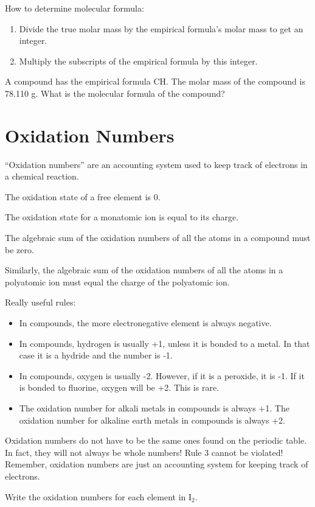 \documentclass[../hchem.tex]{subfiles}
\begin{document}
How to determine molecular formula:
\begin{enumerate}
    \item Divide the true molar mass by the empirical formula's molar mass to get an integer.
    \item Multiply the subscripts of the empirical formula by this integer.
\end{enumerate}

\ex A compound has the empirical formula CH. The molar mass of the compound is 78.110 g. What is the molecular formula of the compound?
\section{Oxidation Numbers}
``Oxidation numbers'' are an accounting system used to keep track of electrons in a chemical reaction.

The oxidation state of a free element is 0.

The oxidation state for a monatomic ion is equal to its charge.

The algebraic sum of the oxidation numbers of all the atoms in a compound must be zero.

Similarly, the algebraic sum of the oxidation numbers of all the atoms in a polyatomic ion must equal the charge of the polyatomic ion.

Really useful rules:
\begin{itemize}
    \item In compounds, the more electronegative element is always negative.
    \item In compounds, hydrogen is usually +1, unless it is bonded to a metal. In that case it is a hydride and the number is -1.
    \item In compounds, oxygen is usually -2. However, if it is a peroxide, it is -1. If it is bonded to fluorine, oxygen will be +2. This is rare.
    \item The oxidation number for alkali metals in compounds is always +1. The oxidation number for alkaline earth metals in compounds is always +2.
\end{itemize}

Oxidation numbers do not have to be the same ones found on the periodic table. In fact, they will not always be whole numbers! 
Rule 3 cannot be violated! Remember, oxidation numbers are just an accounting system for keeping track of electrons.

\ex Write the oxidation numbers for each element in I$_2$.
\end{document}
